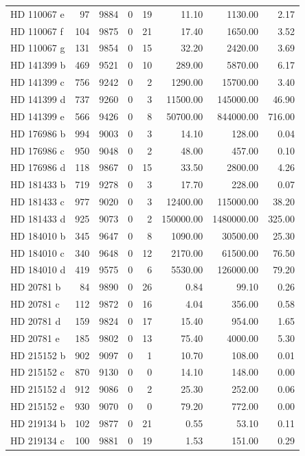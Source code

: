 \begin{table}
\begin{tabular}{lrrrrrrr}
HD 110067 e & 97 & 9884 & 0 & 19 & 11.10 & 1130.00 & 2.17 \\
HD 110067 f & 104 & 9875 & 0 & 21 & 17.40 & 1650.00 & 3.52 \\
HD 110067 g & 131 & 9854 & 0 & 15 & 32.20 & 2420.00 & 3.69 \\
HD 141399 b & 469 & 9521 & 0 & 10 & 289.00 & 5870.00 & 6.17 \\
HD 141399 c & 756 & 9242 & 0 & 2 & 1290.00 & 15700.00 & 3.40 \\
HD 141399 d & 737 & 9260 & 0 & 3 & 11500.00 & 145000.00 & 46.90 \\
HD 141399 e & 566 & 9426 & 0 & 8 & 50700.00 & 844000.00 & 716.00 \\
HD 176986 b & 994 & 9003 & 0 & 3 & 14.10 & 128.00 & 0.04 \\
HD 176986 c & 950 & 9048 & 0 & 2 & 48.00 & 457.00 & 0.10 \\
HD 176986 d & 118 & 9867 & 0 & 15 & 33.50 & 2800.00 & 4.26 \\
HD 181433 b & 719 & 9278 & 0 & 3 & 17.70 & 228.00 & 0.07 \\
HD 181433 c & 977 & 9020 & 0 & 3 & 12400.00 & 115000.00 & 38.20 \\
HD 181433 d & 925 & 9073 & 0 & 2 & 150000.00 & 1480000.00 & 325.00 \\
HD 184010 b & 345 & 9647 & 0 & 8 & 1090.00 & 30500.00 & 25.30 \\
HD 184010 c & 340 & 9648 & 0 & 12 & 2170.00 & 61500.00 & 76.50 \\
HD 184010 d & 419 & 9575 & 0 & 6 & 5530.00 & 126000.00 & 79.20 \\
HD 20781 b & 84 & 9890 & 0 & 26 & 0.84 & 99.10 & 0.26 \\
HD 20781 c & 112 & 9872 & 0 & 16 & 4.04 & 356.00 & 0.58 \\
HD 20781 d & 159 & 9824 & 0 & 17 & 15.40 & 954.00 & 1.65 \\
HD 20781 e & 185 & 9802 & 0 & 13 & 75.40 & 4000.00 & 5.30 \\
HD 215152 b & 902 & 9097 & 0 & 1 & 10.70 & 108.00 & 0.01 \\
HD 215152 c & 870 & 9130 & 0 & 0 & 14.10 & 148.00 & 0.00 \\
HD 215152 d & 912 & 9086 & 0 & 2 & 25.30 & 252.00 & 0.06 \\
HD 215152 e & 930 & 9070 & 0 & 0 & 79.20 & 772.00 & 0.00 \\
HD 219134 b & 102 & 9877 & 0 & 21 & 0.55 & 53.10 & 0.11 \\
HD 219134 c & 100 & 9881 & 0 & 19 & 1.53 & 151.00 & 0.29 \\

\end{tabular}
\end{table}
